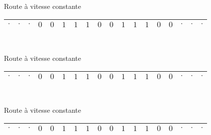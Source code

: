 \documentclass[12pt]{beamer}
\begin{document}
\begin{frame}{Route à vitesse constante}
\addtocounter{framenumber}{-1}
\begin{center}
    \begin{tabular}{|c|c|c|c|c|c|c|c|c|c|c|c|c|c|c|c|c|c|}\hline
     $\cdot$ & $\cdot$ & $\cdot$ & $0$ & $0$ & $1$ & $1$ & $1$ & $0$ & $0$ & $1$ & $1$ & $1$ & $0$ & $0$ & $\cdot$ & $\cdot$ & $\cdot$ \\\hline
     
\end{tabular}\\
\end{center}
\end{frame}

\begin{frame}{Route à vitesse constante}
\addtocounter{framenumber}{-1}
\begin{center}
    \begin{tabular}{|c|c|c|c|c|c|c|c|c|c|c|c|c|c|c|c|c|c|}\hline
     $\cdot$ & $\cdot$ & $\cdot$ & $0$ & $0$ & $1$ & $1$ & $1$ & $0$ & $0$ & $1$ & $1$ & $1$ & $0$ & $0$ & $\cdot$ & $\cdot$ & $\cdot$ \\\hline
     
\end{tabular}\\
\end{center}
\end{frame}

\begin{frame}{Route à vitesse constante}
\addtocounter{framenumber}{-1}
\begin{center}
    \begin{tabular}{|c|c|c|c|c|c|c|c|c|c|c|c|c|c|c|c|c|c|}\hline
     $\cdot$ & $\cdot$ & $\cdot$ & $0$ & $0$ & $1$ & $1$ & $1$ & $0$ & $0$ & $1$ & $1$ & $1$ & $0$ & $0$ & $\cdot$ & $\cdot$ & $\cdot$ \\\hline
     
\end{tabular}\\
\end{center}
\end{frame}
\end{document}
